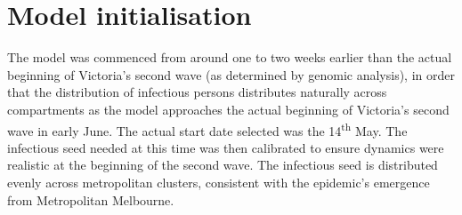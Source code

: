 \section{Model initialisation}
The model was commenced from around one to two weeks earlier than the actual beginning of Victoria's second wave (as determined by genomic analysis), in order that the distribution of infectious persons distributes naturally across compartments as the model approaches the actual beginning of Victoria's second wave in early June. The actual start date selected was the 14\textsuperscript{th} May. The infectious seed needed at this time was then calibrated to ensure dynamics were realistic at the beginning of the second wave. The infectious seed is distributed evenly across metropolitan clusters, consistent with the epidemic's emergence from Metropolitan Melbourne.